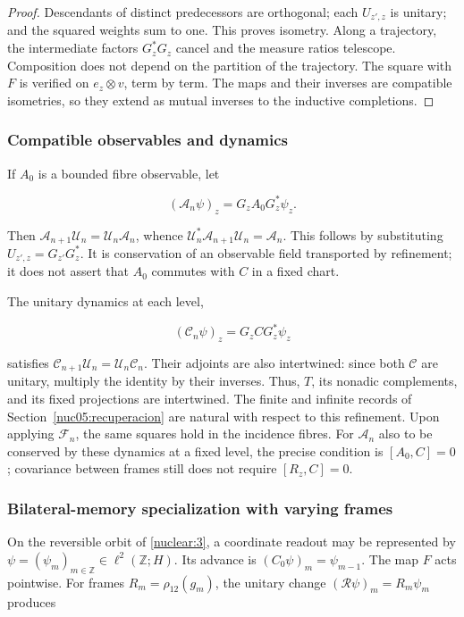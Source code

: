 \begin{proof}
Descendants of distinct predecessors are orthogonal; each \(U_{z',z}\) is unitary; and the squared weights sum to one. This proves isometry. Along a trajectory, the intermediate factors \(G_z^*G_z\) cancel and the measure ratios telescope. Composition does not depend on the partition of the trajectory. The square with \(F\) is verified on \(e_z\otimes v\), term by term. The maps and their inverses are compatible isometries, so they extend as mutual inverses to the inductive completions.
\end{proof}

\subsubsection{Compatible observables and dynamics}

If \(A_0\) is a bounded fibre observable, let

\[
(\mathscr A_n\psi)_z=G_zA_0G_z^*\psi_z.
\]

Then \(\mathscr A_{n+1}\mathscr U_n=\mathscr U_n\mathscr A_n\), whence \(\mathscr U_n^*\mathscr A_{n+1}\mathscr U_n=\mathscr A_n\). This follows by substituting \(U_{z',z}=G_{z'}G_z^*\). It is conservation of an observable field transported by refinement; it does not assert that \(A_0\) commutes with \(C\) in a fixed chart.

The unitary dynamics at each level,

\[
(\mathscr C_n\psi)_z=G_zCG_z^*\psi_z
\]

satisfies \(\mathscr C_{n+1}\mathscr U_n=\mathscr U_n\mathscr C_n\). Their adjoints are also intertwined: since both \(\mathscr C\) are unitary, multiply the identity by their inverses. Thus, \(T\), its nonadic complements, and its fixed projections are intertwined. The finite and infinite records of Section~\ref{nuc05:recuperacion} are natural with respect to this refinement. Upon applying \(\mathscr F_n\), the same squares hold in the incidence fibres. For \(\mathscr A_n\) also to be conserved by these dynamics at a fixed level, the precise condition is \([A_0,C]=0\); covariance between frames still does not require \([R_z,C]=0\).

\subsubsection{Bilateral-memory specialization with varying frames}

On the reversible orbit of \cref{nuclear:3}, a coordinate readout may be represented by \(\psi=(\psi_m)_{m\in\mathbb Z}\in\ell^2(\mathbb Z;H)\). Its advance is \((C_0\psi)_m=\psi_{m-1}\). The map \(F\) acts pointwise. For frames \(R_m=\rho_{12}(g_m)\), the unitary change \((\mathscr R\psi)_m=R_m\psi_m\) produces

